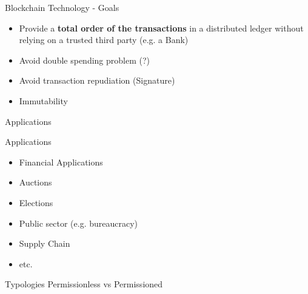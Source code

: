 \begin{frame}{Blockchain Technology - Goals}
    \begin{itemize}

        \item Provide a \textbf{total order of the transactions} in a 
        distributed ledger without relying on a trusted third party (e.g. a 
        Bank)
        
        \item Avoid double spending problem (?)
        
        \item Avoid transaction repudiation (Signature)
        
        \item Immutability
        
    \end{itemize}
\end{frame}

\begin{frame}{Applications}
    
    \begin{block}{Applications}
        \begin{itemize}
            \item Financial Applications
            \item Auctions
            \item Elections
            \item Public sector (e.g. bureaucracy)
            \item Supply Chain
            \item etc.
        \end{itemize}
    \end{block}

    \begin{block}{Typologies}
        Permissionless vs Permissioned
    \end{block}
    
    
\end{frame}

